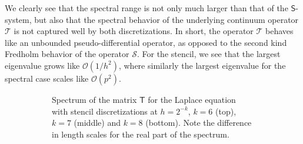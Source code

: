 \documentclass[final,onefignum,onetabnum]{siamart250211}
\newcommand{\mtx}[1]{\bm{\mathsf{#1}}}
\theoremstyle{definition}
\begin{document}
We clearly see that the spectral range is not only much larger than that of the $\mtx{S}$-system, but also that the spectral behavior of the underlying continuum operator $\mathcal{T}$ is not captured well by both discretizations. In short, the operator $\mathcal{T}$ behaves like an unbounded pseudo-differential operator, as opposed to the second kind Fredholm behavior of the operator $\mathcal{S}$. For the stencil, we see that the largest eigenvalue grows like $\mathcal{O}(1/h^2)$, where similarly the largest eigenvalue for the spectral case scales like $\mathcal{O}(p^2)$.
\begin{figure}[H]
    \centering
    \begin{subfigure}{.48\linewidth}
    \caption{Spectrum of the matrix $\mtx{T}$ for the Laplace equation with stencil discretizations at $h=2^{-k}$, $k=6$ (top), $k=7$ (middle) and $k=8$ (bottom). Note the difference in length scales for the real part of the spectrum.}
    \end{subfigure}
\hfill
    \begin{subfigure}{.48\linewidth}

\end{subfigure}
\end{figure}
\end{document}

